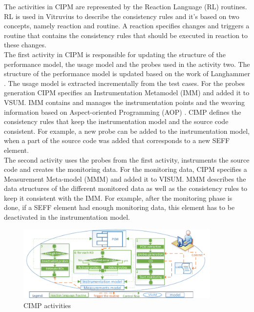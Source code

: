 The activities in CIPM are represented by the Reaction Language (RL) routines. RL is used in Vitruvius to describe the consistency rules and it's based on two concepts, namely reaction and routine. A reaction specifies changes and triggers a routine that contains the consistency rules that should be executed in reaction to these changes. \\ 

The first activity in CIPM is responsible for updating the structure of the performance model, the usage model and the probes used in the activity two. The structure of the performance model is updated based on the work of Langhammer \cite{langhammer2015co}. The usage model is extracted incrementally from the test cases. For the probes generation CIPM specifies an Instrumentation Metamodel (IMM) and added it to VSUM. IMM contains and manages the instrumentation points and the weaving information based on Aspect-oriented Programming (AOP) \cite{kiczales1997j}. CIMP defines the consistency rules that keep the instrumentation model and the source code consistent. For example, a new probe can be added to the instrumentation model, when a part of the source code was added that corresponds to a new SEFF element. \\

The second activity uses the probes from the first activity, instruments the source code and creates the monitoring data. For the monitoring data, CIPM specifies a Measurement Meta-model (MMM) and added it to VISUM. MMM describes the data structures of the different monitored data as well as the consistency rules to keep it consistent with the IMM. For example, after the monitoring phase is done, if a SEFF element had enough monitoring data, this element has to be deactivated in the instrumentation model. 

\begin{figure}[h]
\centering
\includegraphics[width=0.9\textwidth]{figures/cipm}
\caption{CIMP activities}
\label{fig:CIMP activities}
\end{figure} 

